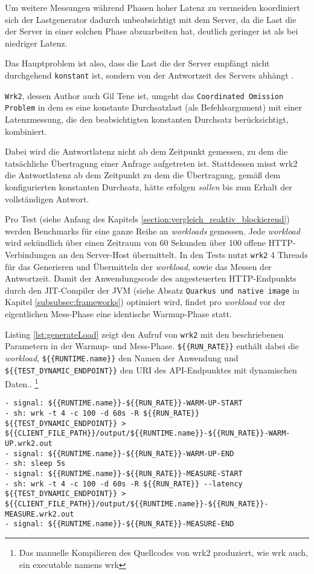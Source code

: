 Um weitere Messungen während Phasen hoher Latenz zu vermeiden koordiniert sich der Lastgenerator dadurch unbeabsichtigt mit dem Server, da die Last
die der Server in einer solchen Phase abzuarbeiten hat, deutlich geringer ist als bei niedriger Latenz.

Das Hauptproblem ist also, dass die Last die der Server empfängt
nicht durchgehend \verb|konstant| ist, sondern von der Antwortzeit des Servers abhängt \parencite{mci/Friedrich2017}.

\newpage
\verb|Wrk2|, dessen Author auch Gil Tene ist, umgeht das \verb|Coordinated Omission Problem| in dem es eine konstante Durchsatzlast (als Befehlsargument) mit
einer Latenzmessung, die den beabsichtigten konstanten Durchsatz berücksichtigt, kombiniert.

Dabei wird die Antwortlatenz nicht ab dem Zeitpunkt gemessen, zu dem die tatsächliche Übertragung einer Anfrage aufgetreten ist.
Stattdessen misst wrk2 die Antwortlatenz ab dem Zeitpunkt zu dem die Übertragung,
gemäß dem konfigurierten konstanten Durchsatz, hätte erfolgen \textit{sollen} bis zum Erhalt der vollständigen Antwort\parencite{Wrk2}.

Pro Test (siehe Anfang des Kapitels \ref{section:vergleich_reaktiv_blockierend}) werden Benchmarks für eine ganze Reihe an \textit{workloads} gemessen.
Jede \textit{workload} wird sekündlich über einen Zeitraum von 60 Sekunden über 100 offene HTTP-Verbindungen an den Server-Host übermittelt.
In den Tests nutzt \verb|wrk2| 4 Threads für das Generieren und Übermitteln der \textit{workload}, sowie das Messen der Antwortzeit.
\newline\newline
Damit der Anwendungscode des angesteuerten HTTP-Endpunkts durch den JIT-Compiler der JVM (siehe Absatz \verb|Quarkus und native image| in Kapitel
\ref{subsubsec:frameworks}) optimiert wird, findet pro \textit{workload} vor der eigentlichen Mess-Phase eine identische Warmup-Phase statt.

Listing \ref*{lst:generateLoad} zeigt den Aufruf von \verb|wrk2| mit den beschriebenen Parametern in der Warmup- und Mess-Phase.
\verb|${{RUN_RATE}}| enthält dabei die \textit{workload}, \verb|${{RUNTIME.name}}| den Namen der Anwendung und \verb|${{TEST_DYNAMIC_ENDPOINT}}| den
URI des API-Endpunktes mit dynamischen Daten..
\footnote{Das manuelle Kompilieren des Quellcodes von wrk2 produziert, wie wrk auch, ein executable namens wrk}

\begin{lstlisting}[caption=Auszug des qDup Skripts generate load, captionpos=b, label=lst:generateLoad]
- signal: ${{RUNTIME.name}}-${{RUN_RATE}}-WARM-UP-START
- sh: wrk -t 4 -c 100 -d 60s -R ${{RUN_RATE}} ${{TEST_DYNAMIC_ENDPOINT}} > ${{CLIENT_FILE_PATH}}/output/${{RUNTIME.name}}-${{RUN_RATE}}-WARM-UP.wrk2.out
- signal: ${{RUNTIME.name}}-${{RUN_RATE}}-WARM-UP-END
- sh: sleep 5s
- signal: ${{RUNTIME.name}}-${{RUN_RATE}}-MEASURE-START
- sh: wrk -t 4 -c 100 -d 60s -R ${{RUN_RATE}} --latency ${{TEST_DYNAMIC_ENDPOINT}} > ${{CLIENT_FILE_PATH}}/output/${{RUNTIME.name}}-${{RUN_RATE}}-MEASURE.wrk2.out
- signal: ${{RUNTIME.name}}-${{RUN_RATE}}-MEASURE-END
   \end{lstlisting}

